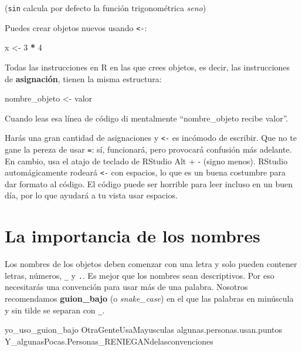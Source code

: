 \documentclass[11pt,oneside]{report}
\newenvironment{Shaded}{\begin{snugshade}}{\end{snugshade}}
\newcommand{\DecValTok}[1]{\textcolor[rgb]{0.00,0.00,0.81}{#1}}
\newcommand{\NormalTok}[1]{#1}
\newcommand{\OperatorTok}[1]{\textcolor[rgb]{0.81,0.36,0.00}{\textbf{#1}}}
\newcommand{\StringTok}[1]{\textcolor[rgb]{0.31,0.60,0.02}{#1}}
\begin{document}
(\texttt{sin} calcula por defecto la función trigonométrica \emph{seno})

Puedes crear objetos nuevos usando \texttt{\textless{}-}:

\begin{Shaded}
\begin{Highlighting}[]
\NormalTok{x <-}\StringTok{ }\DecValTok{3} \OperatorTok{*}\StringTok{ }\DecValTok{4}
\end{Highlighting}
\end{Shaded}

Todas las instrucciones en R en las que crees objetos, es decir, las
instrucciones de \textbf{asignación}, tienen la misma estructura:

\begin{Shaded}
\begin{Highlighting}[]
\NormalTok{nombre_objeto <-}\StringTok{ }\NormalTok{valor}
\end{Highlighting}
\end{Shaded}

Cuando leas esa línea de código di mentalmente ``nombre\_objeto recibe
valor''.

Harás una gran cantidad de asignaciones y \texttt{\textless{}-} es
incómodo de escribir. Que no te gane la pereza de usar \texttt{=}: sí,
funcionará, pero provocará confusión más adelante. En cambio, usa el
atajo de teclado de RStudio Alt + - (signo menos). RStudio
automágicamente rodeará \texttt{\textless{}-} con espacios, lo que es un
buena costumbre para dar formato al código. El código puede ser horrible
para leer incluso en un buen día, por lo que ayudará a tu vista usar
espacios.

\hypertarget{la-importancia-de-los-nombres}{%
\section{La importancia de los
nombres}\label{la-importancia-de-los-nombres}}

Los nombres de los objetos deben comenzar con una letra y solo pueden
contener letras, números, \texttt{\_} y \texttt{.}. Es mejor que los
nombres sean descriptivos. Por eso necesitarás una convención para usar
más de una palabra. Nosotros recomendamos \textbf{guion\_bajo} (o
\emph{snake\_case}) en el que las palabras en minúscula y sin tilde se
separan con \texttt{\_}.

\begin{Shaded}
\begin{Highlighting}[]
\NormalTok{yo_uso_guion_bajo}
\NormalTok{OtraGenteUsaMayusculas}
\NormalTok{algunas.personas.usan.puntos}
\NormalTok{Y_algunasPocas.Personas_RENIEGANdelasconvenciones}
\end{Highlighting}
\end{Shaded}
\end{document}
